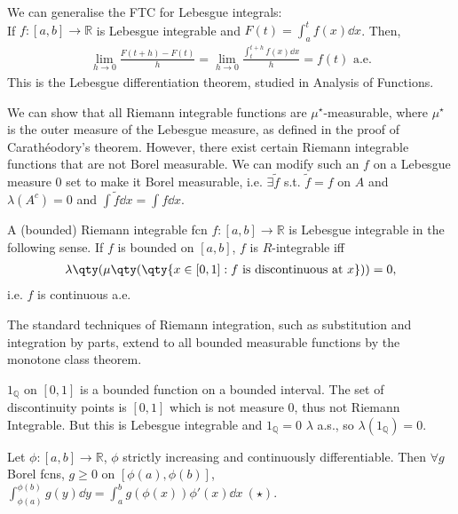 \begin{remark}
	We can generalise the FTC for Lebesgue integrals: \\
	If $f : [a, b] \to \mathbb{R}$ is Lebesgue integrable and $F(t) = \int_{a}^{t} f(x) \dd{x}$.
	Then,
	\begin{align*}
		\lim_{h \to 0} \frac{F(t+h) - F(t)}{h} = \lim_{h \to 0} \frac{\int_{t}^{t + h} f(x) \dd{x}}{h} = f(t) \text{ a.e.}
	\end{align*}
	This is the Lebesgue differentiation theorem, studied in Analysis of Functions.
\end{remark}

\begin{remark}
	We can show that all Riemann integrable functions are $\mu^\star$-measurable, where $\mu^\star$ is the outer measure of the Lebesgue measure, as defined in the proof of Carath\'eodory's theorem.
	However, there exist certain Riemann integrable functions that are not Borel measurable.
	We can modify such an $f$ on a Lebesgue measure $0$ set to make it Borel measurable, i.e. $\exists \widetilde f$ s.t. $\widetilde{f} = f$ on $A$ and $\lambda(A^c) = 0$ and $\int \widetilde{f} \dd{x} = \int f \dd{x}$.

	A (bounded) Riemann integrable fcn $f : [a, b] \to \mathbb{R}$ is Lebesgue integrable in the following sense.
	If $f$ is bounded on $[a, b]$, $f$ is $R$-integrable iff
	\begin{align*}
		\lambda\qty(\mu\qty(\qty{x \in [0,1] : f \text{ is discontinuous at } x})) = 0,
	\end{align*} i.e. $f$ is continuous a.e.

	The standard techniques of Riemann integration, such as substitution and integration by parts, extend to all bounded measurable functions by the monotone class theorem.
\end{remark}

\begin{example}
	$1_\mathbb{Q}$ on $[0, 1]$ is a bounded function on a bounded interval.
	The set of discontinuity points is $[0, 1]$ which is not measure $0$, thus not Riemann Integrable.
	But this is Lebesgue integrable and $1_\mathbb{Q} = 0$ $\lambda$ a.s., so $\lambda(1_\mathbb{Q}) = 0$.
\end{example}

\begin{theorem}
	Let $\phi : [a, b] \to \mathbb{R}$, $\phi$ strictly increasing and continuously differentiable.
	Then $\forall g$ Borel fcns, $g \geq 0$ on $[\phi(a), \phi(b)]$, $\int_{\phi(a)}^{\phi(b)} g(y) \dd{y} = \int_a^b g(\phi(x)) \phi'(x) \dd{x} \ (\star)$.
\end{theorem}

